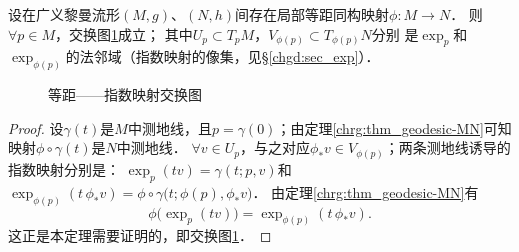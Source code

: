 \begin{theorem}\label{chlg:thm_isoexp}
    设在广义黎曼流形$(M,g)$、$(N,h)$间存在局部等距同构映射$\phi:M\to N$．
    则$\forall p\in M$，交换图\ref{chlg:pic_exp-exchange}成立；
    其中$U_p\subset T_pM$，$V_{\phi(p)}\subset T_{\phi(p)}N$分别
    是$\exp_p$和$\exp_{\phi(p)}$的法邻域（指数映射的像集，见\S\ref{chgd:sec_exp}）．
\end{theorem}

\begin{figure}[htb]
    \centering
    \caption{等距——指数映射交换图}\label{chlg:pic_exp-exchange}
\end{figure}

\begin{proof}
    设$\gamma(t)$是$M$中测地线，且$p=\gamma(0)$；由定理\ref{chrg:thm_geodesic-MN}可知
    映射$\phi\circ\gamma(t)$是$N$中测地线．
    $\forall v\in U_p$，与之对应$\phi_* v \in V_{\phi(p)}$；两条测地线诱导的指数映射分别是：
    $\exp_p(t v)=\gamma(t;p,v)$和
    $\exp_{\phi(p)}(t\, \phi_*v)=\phi\circ\gamma\bigl(t;\phi(p),\phi_* v\bigr)$．
    由定理\ref{chrg:thm_geodesic-MN}有
    \begin{equation}\label{chlg:eqn_isoexp}
        \phi \bigl(\exp_p(t v)\bigr) = \exp_{\phi(p)}(t\, \phi_* v ) .
    \end{equation}
    这正是本定理需要证明的，即交换图\ref{chlg:pic_exp-exchange}．
\end{proof}

